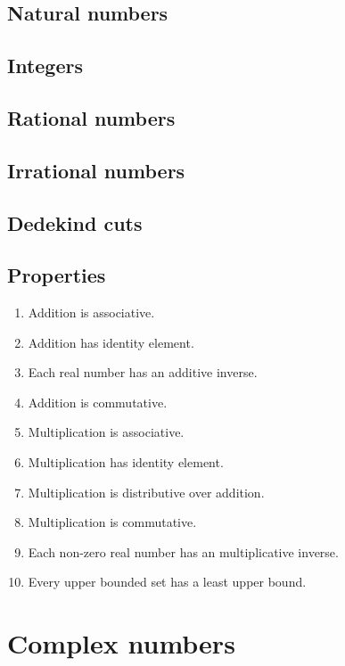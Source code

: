 \documentclass[class=mike-apostol-mathematical-analysis,crop=false]{standalone}
\begin{document}
\subsection*{Natural numbers}

\subsection*{Integers}

\subsection*{Rational numbers}

\subsection*{Irrational numbers}

\subsection*{Dedekind cuts}

\subsection*{Properties}

\begin{enumerate}
    \item Addition is associative.
    \item Addition has identity element.
    \item Each real number has an additive inverse.
    \item Addition is commutative.
    \item Multiplication is associative.
    \item Multiplication has identity element.
    \item Multiplication is distributive over addition.
    \item Multiplication is commutative.
    \item Each non-zero real number has an multiplicative inverse.
    \item Every upper bounded set has a least upper bound.
\end{enumerate}

\section{Complex numbers}
\end{document}
